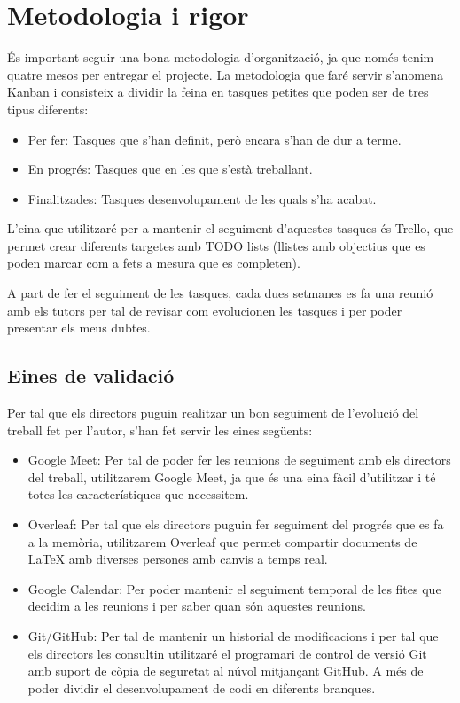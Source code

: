 \documentclass{article}
\begin{document}
\newpage

\section{Metodologia i rigor}

És important seguir una bona metodologia d'organització, ja que només tenim quatre mesos per entregar el projecte. La metodologia que faré servir s'anomena Kanban i consisteix a dividir la feina en tasques petites que poden ser de tres tipus diferents:

\begin{itemize}
    \item Per fer: Tasques que s'han definit, però encara s'han de dur a terme. 
    \item En progrés: Tasques que en les que s'està treballant.
    \item Finalitzades: Tasques desenvolupament de les quals s'ha acabat.
\end{itemize}

L'eina que utilitzaré per a mantenir el seguiment d'aquestes tasques és Trello, que permet crear diferents targetes amb TODO lists (llistes amb objectius que es poden marcar com a fets a mesura que es completen).

A part de fer el seguiment de les tasques, cada dues setmanes es fa una reunió amb els tutors per tal de revisar com evolucionen les tasques i per poder presentar els meus dubtes.

\subsection{Eines de validació}

Per tal que els directors puguin realitzar un bon seguiment de l'evolució del treball fet per l'autor, s'han fet servir les eines següents:

\begin{itemize}
    \item Google Meet: Per tal de poder fer les reunions de seguiment amb els directors del treball, utilitzarem Google Meet, ja que és una eina fàcil d'utilitzar i té totes les característiques que necessitem. 
    \item Overleaf: Per tal que els directors puguin fer seguiment del progrés que es fa a la memòria, utilitzarem Overleaf que permet compartir documents de LaTeX amb diverses persones amb canvis a temps real.
    \item Google Calendar: Per poder mantenir el seguiment temporal de les fites que decidim a les reunions i per saber quan són aquestes reunions.
    \item Git/GitHub: Per tal de mantenir un historial de modificacions i per tal que els directors les consultin utilitzaré el programari de control de versió Git amb suport de còpia de seguretat al núvol mitjançant GitHub. A més de poder dividir el desenvolupament de codi en diferents branques.
\end{itemize}
\end{document}

